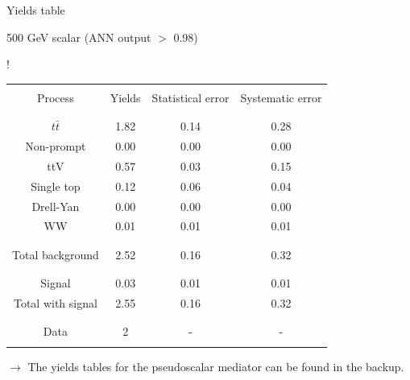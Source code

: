 \documentclass[handout,8 pt]{beamer}
\begin{document}
\begin{frame}{Yields table}
\begin{minipage}[c]{.48\linewidth}
	\end{minipage} \hfill
	\begin{minipage}[c]{.48\linewidth}
	
	\begin{exampleblock}{}{ \begin{center} 500 GeV scalar (ANN output $>$ 0.98) \end{center}} \end{exampleblock} \vspace{6pt}
	
	\resizebox{170pt} {!}{
	\begin{tabular}{c|c|c|c}
	 	& & & \\
		Process & Yields & Statistical error & Systematic error \\
		& & & \\
		\hline \hline
		& & & \\
		$t \bar t$ & 1.82 & 0.14 & 0.28 \\
		Non-prompt & 0.00 & 0.00 & 0.00 \\
		ttV & 0.57 & 0.03 & 0.15 \\
		Single top & 0.12 & 0.06 & 0.04 \\
		Drell-Yan & 0.00 & 0.00 & 0.00 \\
		WW & 0.01 & 0.01 & 0.01 \\
		& & & \\
		\hline
		& & & \\
		Total background & 2.52 & 0.16  & 0.32 \\
		& & & \\
		\hline
		& & & \\
		Signal & 0.03 & 0.01 & 0.01 \\
		Total with signal & 2.55 & 0.16 & 0.32 \\
		& & & \\
		\hline
		& & & \\
		Data & 2 & - & - \\
		& & & \\
	\end{tabular}
	} 
	
	\end{minipage} \hfill \vfill
	
	\justifying
	$\rightarrow$ The yields tables for the pseudoscalar mediator can be found in the backup. \vfill

\end{frame}
\end{document}

